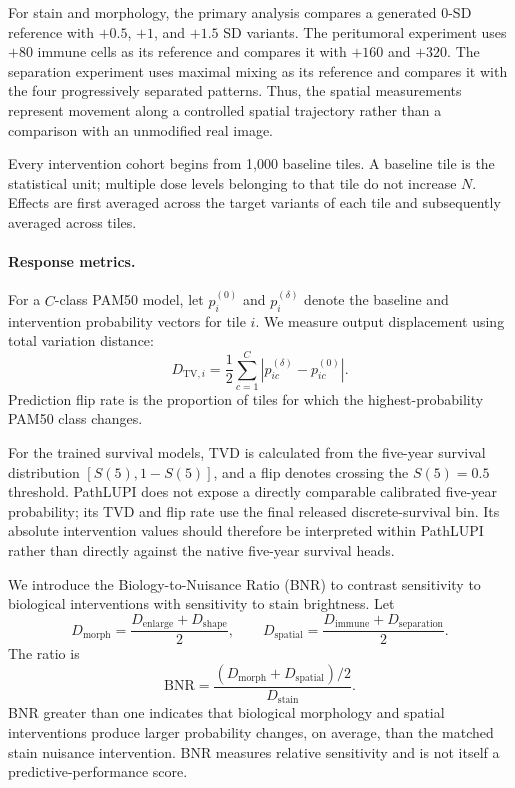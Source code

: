 For stain and morphology, the primary analysis compares a generated 0-SD reference with $+0.5$, $+1$, and $+1.5$ SD variants. The peritumoral experiment uses $+80$ immune cells as its reference and compares it with $+160$ and $+320$. The separation experiment uses maximal mixing as its reference and compares it with the four progressively separated patterns. Thus, the spatial measurements represent movement along a controlled spatial trajectory rather than a comparison with an unmodified real image.

Every intervention cohort begins from 1,000 baseline tiles. A baseline tile is the statistical unit; multiple dose levels belonging to that tile do not increase $N$. Effects are first averaged across the target variants of each tile and subsequently averaged across tiles.

\paragraph{Response metrics.}
For a $C$-class PAM50 model, let
$p_i^{(0)}$ and $p_i^{(\delta)}$ denote the baseline and intervention probability vectors for tile $i$. We measure output displacement using total variation distance:
\begin{equation}
D_{\mathrm{TV},i}
=
\frac{1}{2}
\sum_{c=1}^{C}
\left|
p_{ic}^{(\delta)}-p_{ic}^{(0)}
\right|.
\label{eq:experiment-tvd}
\end{equation}
Prediction flip rate is the proportion of tiles for which the highest-probability PAM50 class changes.

For the trained survival models, TVD is calculated from the five-year survival distribution
$[S(5),1-S(5)]$, and a flip denotes crossing the $S(5)=0.5$ threshold. PathLUPI does not expose a directly comparable calibrated five-year probability; its TVD and flip rate use the final released discrete-survival bin. Its absolute intervention values should therefore be interpreted within PathLUPI rather than directly against the native five-year survival heads.

We introduce the Biology-to-Nuisance Ratio (BNR) to contrast sensitivity to biological interventions with sensitivity to stain brightness. Let
\begin{equation}
D_{\mathrm{morph}}
=
\frac{
D_{\mathrm{enlarge}}+D_{\mathrm{shape}}
}{2},
\qquad
D_{\mathrm{spatial}}
=
\frac{
D_{\mathrm{immune}}+D_{\mathrm{separation}}
}{2}.
\end{equation}
The ratio is
\begin{equation}
\mathrm{BNR}
=
\frac{
\left(D_{\mathrm{morph}}+D_{\mathrm{spatial}}\right)/2
}{
D_{\mathrm{stain}}
}.
\label{eq:bnr}
\end{equation}
BNR greater than one indicates that biological morphology and spatial interventions produce larger probability changes, on average, than the matched stain nuisance intervention. BNR measures relative sensitivity and is not itself a predictive-performance score.

